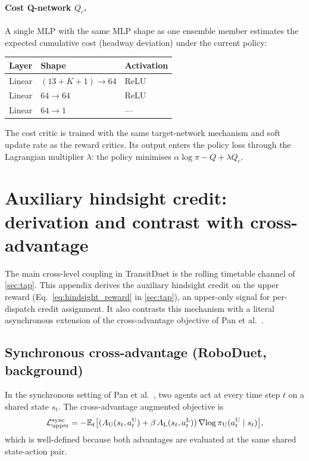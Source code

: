 \paragraph{Cost Q-network $Q_c$.}
A single MLP with the same MLP shape as one ensemble member estimates the expected cumulative cost (headway deviation) under the current policy:
\begin{center}
\small
\begin{tabular}{lll}
\toprule
Layer & Shape & Activation \\
\midrule
Linear & $(13{+}K{+}1) \to 64$ & ReLU \\
Linear & $64 \to 64$ & ReLU \\
Linear & $64 \to 1$ & --- \\
\bottomrule
\end{tabular}
\end{center}
The cost critic is trained with the same target-network mechanism and soft update rate as the reward critics.
Its output enters the policy loss through the Lagrangian multiplier $\lambda$: the policy minimises $\alpha \log \pi - Q + \lambda Q_c$.

\section{Auxiliary hindsight credit: derivation and contrast with cross-advantage}
\label{app:coupling_derivation}

The main cross-level coupling in TransitDuet is the rolling timetable channel of \cref{sec:tap}. This appendix derives the auxiliary hindsight credit on the upper reward (Eq.~\ref{eq:hindsight_reward} in \cref{sec:tap}), an upper-only signal for per-dispatch credit assignment. It also contrasts this mechanism with a literal asynchronous extension of the cross-advantage objective of Pan et al.~\citep{pan2024roboduet}.

\subsection{Synchronous cross-advantage (RoboDuet, background)}

In the synchronous setting of Pan et al.~\citep{pan2024roboduet}, two agents act at every time step $t$ on a shared state $s_t$. The cross-advantage augmented objective is
\begin{equation}
  \mathcal{L}_{\text{upper}}^{\text{sync}} = -\mathbb{E}_{t}\bigl[(A_{\mathrm{U}}(s_t, a_t^{\mathrm{U}}) + \beta\, A_{\mathrm{L}}(s_t, a_t^{\mathrm{L}}))\,\nabla\!\log\pi_{\mathrm{U}}(a_t^{\mathrm{U}} \mid s_t)\bigr],
  \label{eq:roboduet_upper}
\end{equation}
which is well-defined because both advantages are evaluated at the same shared state-action pair.

